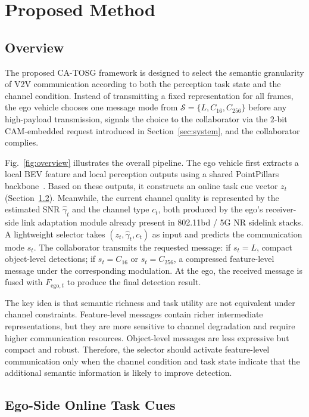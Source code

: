 \documentclass[journal]{IEEEtran}
\newcommand{\method}{CA-TOSG}
\begin{document}
\section{Proposed Method}

\subsection{Overview}

The proposed \method{} framework is designed to select the semantic granularity of V2V communication according to both the perception task state and the channel condition. Instead of transmitting a fixed representation for all frames, the ego vehicle chooses one message mode from $\mathcal{S}=\{L,C_{16},C_{256}\}$ before any high-payload transmission, signals the choice to the collaborator via the $2$-bit CAM-embedded request introduced in Section~\ref{sec:system}, and the collaborator complies.

Fig.~\ref{fig:overview} illustrates the overall pipeline. The ego vehicle first extracts a local BEV feature and local perception outputs using a shared PointPillars backbone~\cite{lang2019pointpillars}. Based on these outputs, it constructs an online task cue vector $z_t$ (Section~\ref{sec:cues}). Meanwhile, the current channel quality is represented by the estimated SNR $\hat\gamma_t$ and the channel type $c_t$, both produced by the ego's receiver-side link adaptation module already present in 802.11bd / 5G NR sidelink stacks. A lightweight selector takes $(z_t,\hat\gamma_t,c_t)$ as input and predicts the communication mode $s_t$. The collaborator transmits the requested message: if $s_t=L$, compact object-level detections; if $s_t=C_{16}$ or $s_t=C_{256}$, a compressed feature-level message under the corresponding modulation. At the ego, the received message is fused with $F_{\mathrm{ego},t}$ to produce the final detection result.

The key idea is that semantic richness and task utility are not equivalent under channel constraints. Feature-level messages contain richer intermediate representations, but they are more sensitive to channel degradation and require higher communication resources. Object-level messages are less expressive but compact and robust. Therefore, the selector should activate feature-level communication only when the channel condition and task state indicate that the additional semantic information is likely to improve detection.

\subsection{Ego-Side Online Task Cues}\label{sec:cues}
\end{document}
